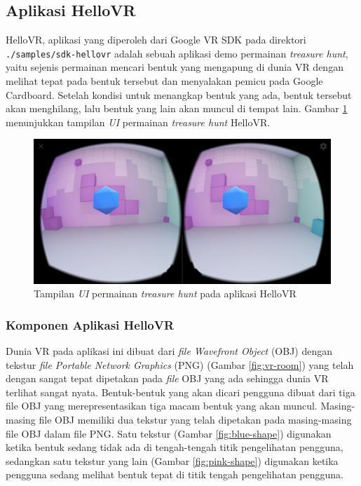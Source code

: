 \subsection{Aplikasi HelloVR}
\label{subs:hello-vr}
HelloVR, aplikasi yang diperoleh dari Google VR SDK pada direktori \texttt{./samples/sdk-hellovr} adalah sebuah aplikasi demo permainan \textit{treasure hunt}, yaitu sejenis permainan mencari bentuk yang mengapung di dunia VR dengan melihat tepat pada bentuk tersebut dan menyalakan pemicu pada Google Cardboard. Setelah kondisi untuk menangkap bentuk yang ada, bentuk tersebut akan menghilang, lalu bentuk yang lain akan muncul di tempat lain. Gambar \ref{fig:treasure-hunt} menunjukkan tampilan \textit{UI} permainan \textit{treasure hunt} HelloVR. 

\begin{figure}[h]
	\centering
		\includegraphics[width=6in]{Gambar/treasure_hunt.jpg}
	\caption{Tampilan \textit{UI} permainan \textit{treasure hunt} pada aplikasi HelloVR}
	\label{fig:treasure-hunt}
\end{figure}

\subsubsection{Komponen Aplikasi HelloVR}
Dunia VR pada aplikasi ini dibuat dari {\it file Wavefront Object} (OBJ) dengan tekstur {\it file Portable Network Graphics} (PNG) (Gambar \ref{fig:vr-room}) yang telah dengan sangat tepat dipetakan pada \textit{file} OBJ yang ada sehingga dunia VR terlihat sangat nyata. Bentuk-bentuk yang akan dicari pengguna dibuat dari tiga file OBJ yang merepresentasikan tiga macam bentuk yang akan muncul. Masing-masing file OBJ memiliki dua tekstur yang telah dipetakan pada masing-masing file OBJ dalam file PNG. Satu tekstur (Gambar \ref{fig:blue-shape}) digunakan ketika bentuk sedang tidak ada di tengah-tengah titik pengelihatan pengguna, sedangkan satu tekstur yang lain (Gambar \ref{fig:pink-shape}) digunakan ketika pengguna sedang melihat bentuk tepat di titik tengah pengelihatan pengguna.

